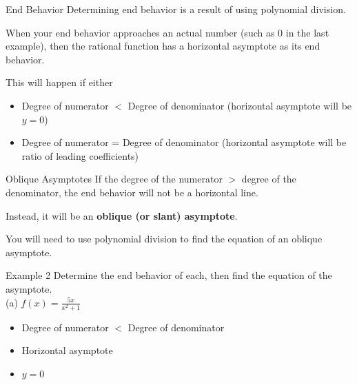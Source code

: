 \documentclass[t,usenames,dvipsnames]{beamer}
\begin{document}
\begin{frame}{End Behavior}
Determining end behavior is a result of using \alert{polynomial division}. \newline\\ \pause

When your end behavior approaches an actual number (such as 0 in the last example), then the rational function has a \alert{horizontal asymptote} as its end behavior. \newline\\ \pause

This will happen if either \newline\\
\begin{itemize}
    \item Degree of numerator $<$ Degree of denominator (horizontal asymptote will be $y = 0$)  \newline\\ \pause
    \item Degree of numerator = Degree of denominator (horizontal asymptote will be ratio of leading coefficients)
\end{itemize}
\end{frame}

\begin{frame}{Oblique Asymptotes}
If the degree of the numerator $>$ degree of the denominator, the end behavior \alert{will not be a horizontal line}. \newline\\ \pause

Instead, it will be an {\color{blue}\textbf{oblique (or slant) asymptote}}. \newline\\ \pause

You will need to use \alert{polynomial division} to find the equation of an oblique asymptote.
\end{frame}

\begin{frame}{Example 2}
Determine the end behavior of each, then find the equation of the asymptote.  \newline\\
(a) \quad $f(x) = \frac{5x}{x^2 + 1}$ \newline\\ \pause
\begin{itemize}
    \item Degree of numerator $<$ Degree of denominator \newline\\ \pause
    \item Horizontal asymptote \newline\\ \pause
    \item $y = 0$ 
\end{itemize}
\end{frame}
\end{document}
